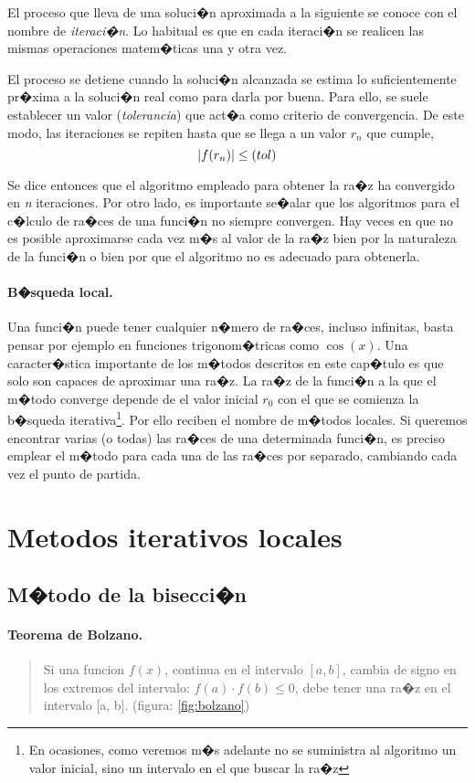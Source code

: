 El proceso que lleva de una soluci�n aproximada a la siguiente se conoce con el nombre de \emph{iteraci�n}. Lo habitual es que en cada iteraci�n se realicen las mismas operaciones matem�ticas una y otra vez. 

El proceso se detiene cuando la soluci�n alcanzada se estima lo suficientemente pr�xima a la soluci�n real como para darla por buena. Para ello, se suele establecer un valor (\emph{tolerancia}) que act�a como criterio de convergencia. De este modo, las iteraciones se repiten hasta que se llega a un valor $r_n$ 	que cumple,
\begin{equation*}
\vert f(r_n) \vert \leq \text(tol)
\end{equation*}

Se dice entonces que el algoritmo empleado para obtener la ra�z ha convergido en \emph{n} iteraciones. Por otro lado, es importante se�alar que los algoritmos para el c�lculo de ra�ces de una funci�n no siempre convergen. Hay veces en que no es posible aproximarse cada vez m�s al valor de la ra�z bien por la naturaleza de la funci�n o bien por que el algoritmo no es adecuado para obtenerla.

\paragraph*{B�squeda local.} Una funci�n puede tener cualquier n�mero de ra�ces, incluso infinitas, basta pensar por ejemplo en funciones trigonom�tricas como $\cos(x)$. Una caracter�stica importante de los m�todos descritos en este cap�tulo es que solo son capaces de aproximar una ra�z. La ra�z de la funci�n a la que el m�todo converge depende de el valor inicial $r_0$ con el que se comienza la b�squeda iterativa\footnote{En ocasiones, como veremos m�s adelante no se suministra al algoritmo un valor inicial, sino un intervalo en el que buscar la ra�z}. Por ello reciben el nombre de m�todos locales. Si queremos encontrar varias (o todas) las ra�ces de una determinada funci�n, es preciso emplear el m�todo para cada una de las ra�ces por separado, cambiando cada vez el punto de partida.

\section{Metodos iterativos locales}
\subsection{M�todo de la bisecci�n}
\paragraph*{Teorema de Bolzano.}
\begin{quote}
Si una funcion $f(x)$, continua en el intervalo $[a, b]$, cambia de signo en los extremos del intervalo: $f(a)\cdot f(b) \le 0$, debe tener una ra�z en el intervalo [a, b]. (figura: \ref{fig:bolzano}) 
\end{quote}

